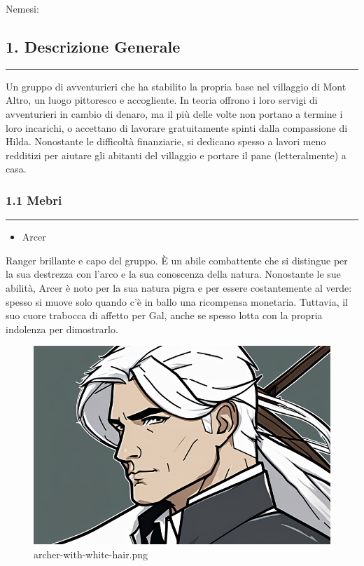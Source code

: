 Nemesi:

\subsection{1. Descrizione Generale}\label{descrizione-generale}

\begin{center}\rule{0.5\linewidth}{0.5pt}\end{center}

Un gruppo di avventurieri che ha stabilito la propria base nel villaggio
di Mont Altro, un luogo pittoresco e accogliente. In teoria offrono i
loro servigi di avventurieri in cambio di denaro, ma il più delle volte
non portano a termine i loro incarichi, o accettano di lavorare
gratuitamente spinti dalla compassione di Hilda. Nonostante le
difficoltà finanziarie, si dedicano spesso a lavori meno redditizi per
aiutare gli abitanti del villaggio e portare il pane (letteralmente) a
casa.

\subsubsection{1.1 Mebri}\label{mebri}

\begin{center}\rule{0.5\linewidth}{0.5pt}\end{center}

\begin{itemize}
\tightlist
\item
  Arcer
\end{itemize}

Ranger brillante e capo del gruppo. È un abile combattente che si
distingue per la sua destrezza con l'arco e la sua conoscenza della
natura. Nonostante le sue abilità, Arcer è noto per la sua natura pigra
e per essere costantemente al verde: spesso si muove solo quando c'è in
ballo una ricompensa monetaria. Tuttavia, il suo cuore trabocca di
affetto per Gal, anche se spesso lotta con la propria indolenza per
dimostrarlo.

\begin{figure}
\centering
\includegraphics{archer-with-white-hair.png}
\caption{archer-with-white-hair.png}
\end{figure}

